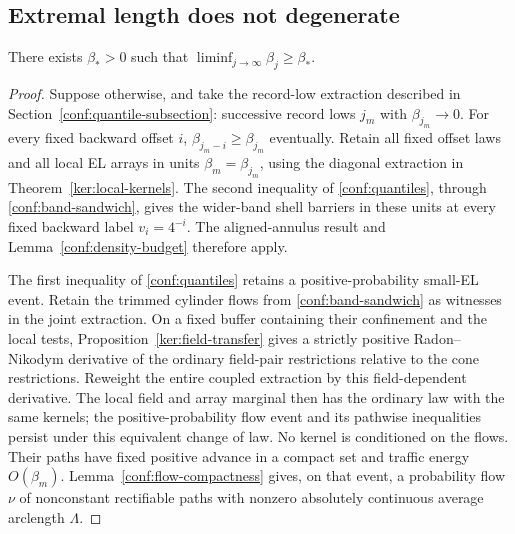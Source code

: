 \subsection{Extremal length does not degenerate}
\label{conf:nondegeneration-subsection}

\begin{proposition}
\label{conf:no-degeneration}
There exists \(\beta_*>0\) such that
\(\liminf_{j\to\infty}\beta_j\ge\beta_*\).
\end{proposition}

\begin{proof}
Suppose otherwise, and take the record-low extraction described in
Section~\ref{conf:quantile-subsection}: successive record lows \(j_m\) with
\(\beta_{j_m}\to0\).  For every fixed backward offset \(i\),
\(\beta_{j_m-i}\ge\beta_{j_m}\) eventually.  Retain all fixed
offset laws and all local EL arrays in units
\(\beta_m=\beta_{j_m}\), using the diagonal extraction in
Theorem~\ref{ker:local-kernels}.  The second inequality of
\eqref{conf:quantiles}, through \eqref{conf:band-sandwich}, gives
the wider-band shell barriers in these units at every fixed backward
label \(v_i=4^{-i}\).  The aligned-annulus result and
Lemma~\ref{conf:density-budget} therefore apply.

The first inequality of \eqref{conf:quantiles} retains a
positive-probability small-EL event.  Retain the trimmed cylinder flows
from \eqref{conf:band-sandwich} as witnesses in the joint extraction.
On a fixed buffer containing their confinement and the local tests,
Proposition~\ref{ker:field-transfer} gives a strictly positive
Radon--Nikodym derivative of the ordinary field-pair restrictions
relative to the cone restrictions.  Reweight the entire coupled
extraction by this field-dependent derivative.  The local field and
array marginal then has the ordinary law with the same kernels;
the positive-probability flow event and its pathwise inequalities
persist under this equivalent change of law.  No kernel is conditioned
on the flows.  Their paths have fixed positive advance in a compact
set and traffic energy \(O(\beta_m)\).  Lemma~\ref{conf:flow-compactness}
gives, on that event, a probability flow \(\nu\) of nonconstant
rectifiable paths with nonzero absolutely continuous average arclength
\(\Lambda\).


\end{proof}
